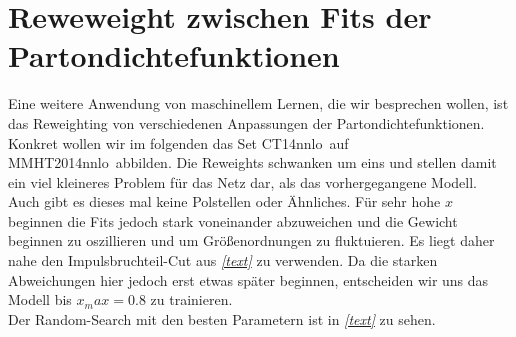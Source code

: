 \section{Reweweight zwischen Fits der Partondichtefunktionen}
Eine weitere Anwendung von maschinellem Lernen, die wir besprechen wollen, ist das Reweighting von verschiedenen Anpassungen der Partondichtefunktionen. Konkret wollen wir im folgenden das Set \glqq CT14nnlo\grqq~auf \glqq MMHT2014nnlo\grqq~abbilden. Die Reweights schwanken um eins und stellen damit ein viel kleineres Problem für das Netz dar, als das vorhergegangene Modell. Auch gibt es dieses mal keine Polstellen oder Ähnliches. Für sehr hohe $x$ beginnen die Fits jedoch stark voneinander abzuweichen und die Gewicht beginnen zu oszillieren und um Größenordnungen zu fluktuieren. Es liegt daher nahe den Impulsbruchteil-Cut aus \textit{\autoref{text}} zu verwenden. Da die starken Abweichungen hier jedoch erst etwas später beginnen, entscheiden wir uns das Modell bis $x_max=0.8$ zu trainieren. \\
Der Random-Search mit den besten Parametern ist in \textit{\autoref{text}} zu sehen.

